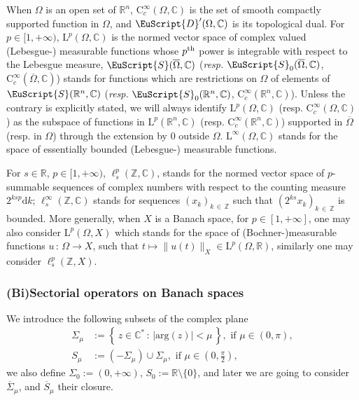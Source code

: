 \documentclass[AHL,Unicode,longabstracts,published]{cedram}
\newcommand{\bbR}{\mathbb{R}}
\newcommand{\bbC}{\mathbb{C}}
\newcommand{\bbZ}{\mathbb{Z}}
\newcommand{\rmd}{\mathrm{d}}
\newcommand{\rmL}{\mathrm{L}}
\newcommand{\rmC}{\mathrm{C}}
\newcommand{\argg}{\mathrm{arg}}
\newcommand{\eus}{\EuScript}
\begin{document}
When $\Omega$ is an open set of $\bbR^n$, $\rmC_c^\infty(\Omega,\bbC)$ is the set of smooth compactly supported function in $\Omega$, and
$\eus{D}'(\Omega,\bbC)$ is its topological dual. For $p\in[1,+\infty)$, $\rmL^p(\Omega,\bbC)$ is the normed vector space of complex valued (Lebesgue-) measurable functions whose $p^{\rm th}$ power is integrable with respect to the Lebesgue measure, $\eus{S}(\overline{\Omega},\bbC)$ (\emph{resp.} $\eus{S}_0(\overline{\Omega},\bbC)$, $\rmC_c^\infty(\overline{\Omega},\bbC)$) stands for functions which are restrictions on $\Omega$ of elements of $\eus{S}(\bbR^n,\bbC)$ (\emph{resp.} $\eus{S}_0(\bbR^n,\bbC)$, $\rmC_c^\infty(\bbR^n,\bbC)$). Unless the contrary is explicitly stated, we will always identify $\rmL^p(\Omega,\bbC)$ (resp. $\rmC_c^\infty(\Omega,\bbC)$) as the subspace of functions in $\rmL^p(\bbR^n,\bbC)$ (resp. $\rmC_c^\infty(\bbR^n,\bbC)$) supported in $\overline{\Omega}$ (resp. in $\Omega$) through the extension by $0$ outside $\Omega$. $\rmL^\infty(\Omega,\bbC)$ stands for the space of essentially bounded (Lebesgue-) measurable functions.

For $s\in\bbR$, $p\in[1,+\infty)$,
$\ell^p_s(\bbZ,\bbC)$, stands for the normed vector space of $p$-summable sequences of complex numbers with respect to the counting measure $2^{ksp}\rmd k$; $\ell^\infty_s(\bbZ,\bbC)$ stands for sequences $(x_k)_{k\,\in\,\bbZ}$ such that $(2^{ks}x_k)_{k\,\in\,\bbZ}$ is bounded. More generally, when $X$ is a Banach space, for $p\in[1,+\infty]$, one may also consider $\rmL^p(\Omega,X)$ which stands for the space of (Bochner-)measurable functions $u\,:\,\Omega\longrightarrow X$, such that $t\mapsto\| u(t)\|_X \in \rmL^p(\Omega,\bbR)$, similarly one may consider $\ell^p_s(\bbZ,X)$.

\subsubsection{(Bi)Sectorial operators on Banach spaces}

We introduce the following subsets of the complex plane
\begin{align*}
\Sigma_\mu &:= \left\{ \,z\in\bbC^\ast\,:\,|\argg(z)|<\mu\,\right\}, \text{ if } \mu\in(0,\pi),\\
S_\mu &:= \left(-\Sigma_\mu\right)\cup \Sigma_\mu, \text{ if } \mu\in\left(0,\frac{\pi}{2}\right),
\end{align*}
we also define $\Sigma_0:= (0,+\infty)$, $S_0:= \bbR\setminus\{0\}$, and later we are going to consider $\overline{\Sigma}_\mu$, and $\overline{S}_\mu$ their closure.
\end{document}
